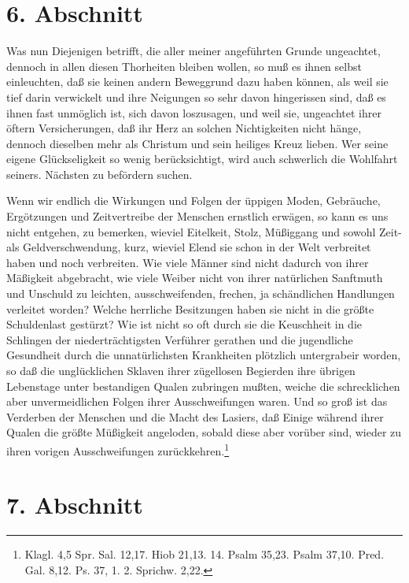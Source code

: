 \section{6. Abschnitt} \label{kap18_ab6}

Was nun Diejenigen betrifft, die aller meiner angeführten Grunde ungeachtet,
dennoch in allen diesen Thorheiten bleiben wollen, so muß es ihnen selbst
einleuchten, daß sie keinen andern Beweggrund dazu haben können, als weil sie
tief darin verwickelt und ihre Neigungen so sehr davon hingerissen sind, daß es
ihnen fast unmöglich ist, sich davon loszusagen, und weil sie, ungeachtet ihrer
öftern Versicherungen, daß ihr Herz an solchen Nichtigkeiten nicht hänge,
dennoch dieselben mehr als Christum und sein heiliges Kreuz lieben. Wer seine
eigene Glückseligkeit so wenig berücksichtigt, wird auch schwerlich die
Wohlfahrt seiners. Nächsten zu befördern suchen.

\medskip

Wenn wir endlich die Wirkungen und Folgen der üppigen Moden, Gebräuche,
Ergötzungen und Zeitvertreibe der Menschen ernstlich erwägen, so kann es uns
nicht entgehen, zu bemerken, wieviel Eitelkeit, Stolz, Müßiggang und sowohl
Zeit- als Geldverschwendung, kurz, wieviel Elend sie schon in der Welt
verbreitet haben und noch verbreiten. Wie viele Männer sind nicht dadurch von
ihrer Mäßigkeit abgebracht, wie viele Weiber nicht von ihrer natürlichen
Sanftmuth und Unschuld zu leichten, ausschweifenden, frechen, ja schändlichen
Handlungen verleitet worden? Welche herrliche Besitzungen haben sie nicht in die
größte Schuldenlast gestürzt? Wie ist nicht so oft durch sie die Keuschheit in
die Schlingen der niederträchtigsten Verführer gerathen und die jugendliche
Gesundheit durch die unnatürlichsten Krankheiten plötzlich untergrabeir worden,
so daß die unglücklichen Sklaven ihrer zügellosen Begierden ihre übrigen
Lebenstage unter bestandigen Qualen zubringen mußten, weiche die schrecklichen
aber unvermeidlichen Folgen ihrer Ausschweifungen waren. Und so groß ist das
Verderben der Menschen und die Macht des Lasiers, daß Einige während ihrer
Qualen die größte Müßigkeit angeloden, sobald diese aber vorüber sind, wieder zu
ihren vorigen Ausschweifungen zurückkehren.\footnote{Klagl. 4,5 Spr. Sal. 12,17.
Hiob 21,13. 14. Psalm 35,23. Psalm 37,10. Pred. Gal. 8,12. Ps. 37, 1. 2.
Sprichw. 2,22.}

\section{7. Abschnitt} \label{kap18_ab7}

